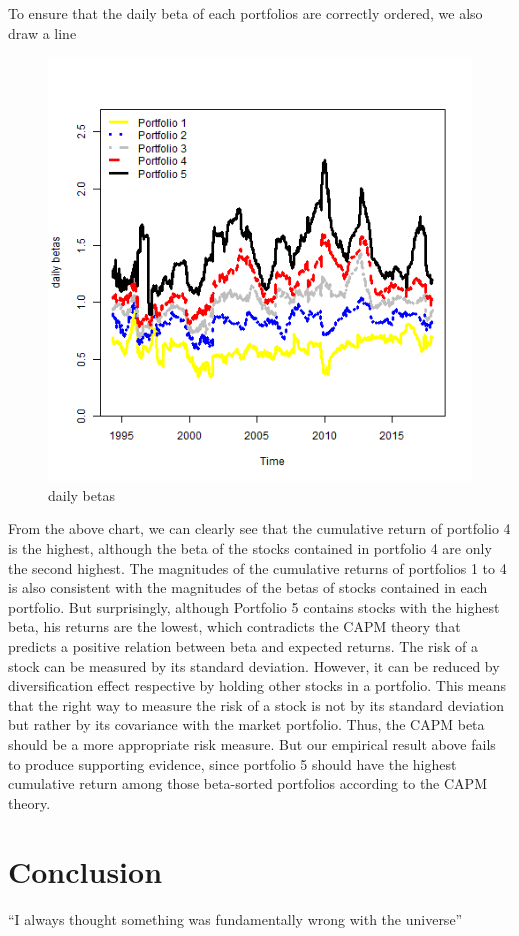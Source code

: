 \documentclass{article}
\begin{document}
\begin{justify}
To ensure that the daily beta of each portfolios are correctly ordered, we also draw a line 
\begin{figure}[H]
\centering
\includegraphics[width=1\textwidth,height=0.7\textwidth]{daily betas}
\caption{daily betas}
\label{fig:daily betas}
\end{figure}
From the above chart, we can clearly see that the cumulative return of portfolio 4 is the highest, although the beta of the stocks contained in portfolio 4 are only the second highest. The magnitudes of the cumulative returns of portfolios 1 to 4 is also consistent with the magnitudes of the betas of stocks contained in each portfolio. But surprisingly, although Portfolio 5 contains stocks with the highest beta, his returns are the lowest, which contradicts the CAPM theory that predicts a positive relation between beta and expected returns.
The risk of a stock can be measured by its standard deviation. However, it can be reduced by diversification effect respective by holding other stocks in a portfolio. This means that the right way to measure the risk of a stock is not by its standard deviation but rather by its covariance with the market portfolio. Thus, the CAPM beta should be a more appropriate risk measure.  But our empirical result above fails to produce supporting evidence, since portfolio 5 should have the highest cumulative return among those beta-sorted portfolios according to the CAPM theory.


\section{Conclusion}
``I always thought something was fundamentally wrong with the universe'' \citep{adams1995hitchhiker}
\end{justify}
\end{document}
